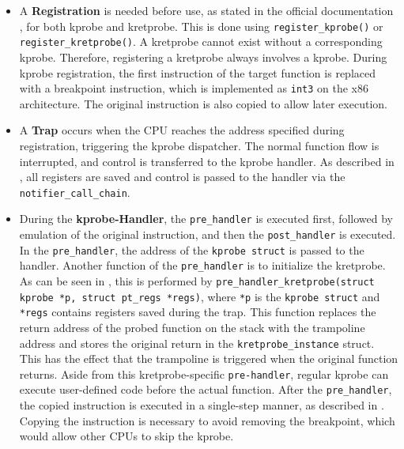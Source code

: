 \begin{itemize}
    \item A \textbf{Registration} is needed before use, as stated in the official documentation \cite{kprobe_doc}, for both \ac{kprobe} and \ac{kretprobe}.  
          This is done using \texttt{register\_kprobe()} or \\
          \texttt{register\_kretprobe()}.  
          A \ac{kretprobe} cannot exist without a corresponding \ac{kprobe}.  
          Therefore, registering a \ac{kretprobe} always involves a \ac{kprobe}.  
          During \ac{kprobe} registration, the first instruction of the target function is replaced with a breakpoint instruction, which is implemented as \texttt{int3} on the x86 architecture.  
          The original instruction is also copied to allow later execution.  
    \item A \textbf{Trap} occurs when the CPU reaches the address specified during registration, triggering the \ac{kprobe} dispatcher.  
          The normal function flow is interrupted, and control is transferred to the \ac{kprobe} handler.  
          As described in \cite{kprobe_doc}, all registers are saved and control is passed to the handler via the \texttt{notifier\_call\_chain}.  
    \item During the \textbf{\ac{kprobe}-Handler}, the \texttt{pre\_handler} is executed first, followed by emulation of the original instruction, and then the \texttt{post\_handler} is executed.  
          In the \texttt{pre\_handler}, the address of the \texttt{\ac{kprobe} struct}  is passed to the handler.  
          Another function of the \texttt{pre\_handler} is to initialize the \ac{kretprobe}.  
          As can be seen in \cite{linux_kprobes_616}, this is performed by \texttt{pre\_handler\_kretprobe(struct kprobe *p, struct pt\_regs *regs)}, where \texttt{*p} is the \texttt{\ac{kprobe} struct}  and \texttt{*regs} contains registers saved during the trap.  
          This function replaces the return address of the probed function on the stack with the trampoline address and stores the original return in the \texttt{kretprobe\_instance} struct.  
          This has the effect that the trampoline is triggered when the original function returns.  
          Aside from this kretprobe-specific \texttt{pre-handler}, regular \ac{kprobe} can execute user-defined code before the actual function.  
          After the \texttt{pre\_handler}, the copied instruction is executed in a single-step manner, as described in \cite{kprobe_doc}.  
          Copying the instruction is necessary to avoid removing the breakpoint, which would allow other \acp{CPU} to skip the \ac{kprobe}.  

\end{itemize}
